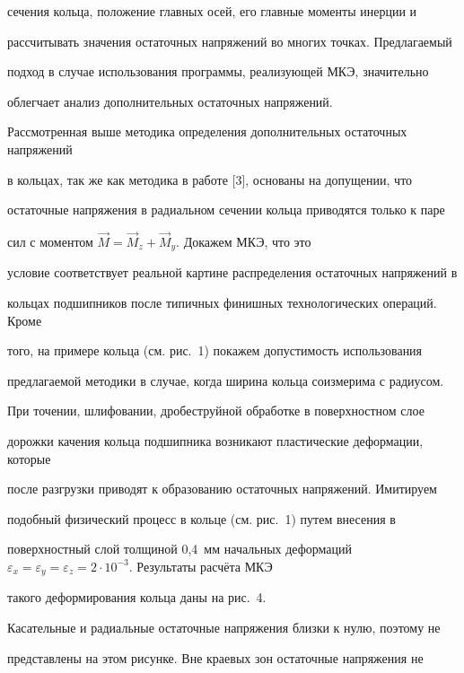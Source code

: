 сечения кольца, положение главных осей, его главные моменты инерции и

рассчитывать значения остаточных напряжений во многих точках. Предлагаемый

подход в случае использования программы, реализующей МКЭ, значительно

облегчает анализ дополнительных остаточных напряжений.



Рассмотренная выше методика определения дополнительных остаточных напряжений

в кольцах, так же как методика в работе [3], основаны на допущении, что

остаточные напряжения в радиальном сечении кольца приводятся только к паре

сил с моментом $\vec {M}=\vec {M}_z +\vec {M}_y $. Докажем МКЭ, что это

условие соответствует реальной картине распределения остаточных напряжений в

кольцах подшипников после типичных финишных технологических операций. Кроме

того, на примере кольца (см. рис.~1) покажем допустимость использования

предлагаемой методики в случае, когда ширина кольца соизмерима с радиусом.





При точении, шлифовании, дробеструйной обработке в поверхностном слое

дорожки качения кольца подшипника возникают пластические деформации, которые

после разгрузки приводят к образованию остаточных напряжений. Имитируем

подобный физический процесс в кольце (см. рис.~1) путем внесения в

поверхностный слой толщиной 0,4~мм начальных деформаций \mbox{$\varepsilon _x

=\varepsilon _y =\varepsilon _z =2\cdot 10^{-3}$.} Результаты расчёта МКЭ

такого деформирования кольца даны на рис.~4.











Касательные и радиальные остаточные напряжения близки к нулю, поэтому не

представлены на этом рисунке. Вне краевых зон остаточные напряжения не

